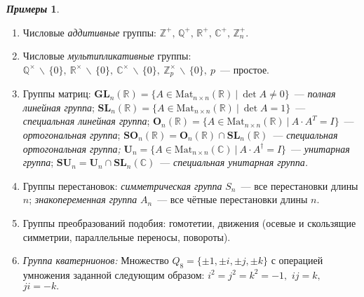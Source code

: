 \documentclass[a4paper, 14pt]{extarticle}
\newcommand{\integers}{\mathbb{Z}}
\newcommand{\rationals}{\mathbb{Q}}
\newcommand{\real}{\mathbb{R}}
\newcommand{\complex}{\mathbb{C}}
\newcommand{\GL}{\mathbf{GL}}
\newcommand{\SL}{\mathbf{SL}}
\newcommand{\Orth}{\mathbf{O}}
\newcommand{\SOrth}{\mathbf{SO}}
\newcommand{\Unit}{\mathbf{U}}
\newcommand{\SUnit}{\mathbf{SU}}
\theoremstyle{definition}
\newtheorem*{exmpls}{\textit{Примеры}}
\theoremstyle{plain}
\numberwithin{theorem}{section}
\numberwithin{definition}{section}
\numberwithin{statement}{section}
\numberwithin{lemma}{section}
\numberwithin{consequence}{section}
\begin{document}
	\begin{exmpls}
		\
		\begin{enumerate}
			\setlength\itemsep{0.1em}
			\item Числовые \textit{аддитивные} группы: \newline
			$\integers ^ +, \, \rationals ^ +, \, \real ^ +, \, \complex ^ +, \, 
			\integers_n ^ +.$ 
			\item Числовые \textit{мультипликативные} группы: \newline
			$\rationals ^ {\times} \, \backslash \, \{0\}, \
			\real ^ {\times} \, \backslash \, \{0\}, \
			\complex ^ {\times} \, \backslash \, \{0\}, \
			\integers_p ^ {\times} \, \backslash \, \{0\}, \ p$~--- простое.
			\item Группы матриц: \newline
			${\GL_n(\real) = \{A \in \mathrm{Mat}_{n \times n}(\real) \ | \ \det A \neq 0 \}}$~--- \textit{полная линейная группа}; \newline
			${\SL_n(\real) = \{A \in \mathrm{Mat}_{n \times n}(\real) \ | \ \det A = 1 \}}$~--- \textit{специальная линейная
				группа}; \newline
			${\Orth_n(\real)} = \{A \in \mathrm{Mat}_{n \times n}(\real) \ | \ A \cdot A^T = I\}$~--- \textit{ортогональная группа}; \newline
			${\SOrth_n(\real) = \Orth_n(\real) \cap \SL_n(\real)}$~--- \textit{специальная ортогональная группа;} \newline
                ${\Unit_n = \{A \in \mathrm{Mat}_{n \times n}(\complex) \ | \ A \cdot A^\dagger = I\}}$~--- \textit{унитарная группа}; \newline
                ${\SUnit_n = \Unit_n \cap \SL_n(\complex)}$~--- \textit{специальная унитарная группа.}
			\item Группы перестановок: \newline
			\textit{симметрическая группа} $S_n$~--- все перестановки длины $n$;\newline
			\textit{знакопеременная группа} $A_n$~--- все чётные перестановки длины $n$.
			\item Группы преобразований подобия: гомотетии, движения (осевые и скользящие симметрии, параллельные переносы, повороты).
                \item \textit{Группа кватернионов:} \newline
                Множество ${Q_8 = \{\pm 1, \pm i, \pm j, \pm k\}}$ с операцией умножения заданной следующим образом: ${i^2 = j^2 = k^2 = -1,}$ ${ij = k,}$ ${ji = -k.}$
		\end{enumerate}
	\end{exmpls}
\end{document}
